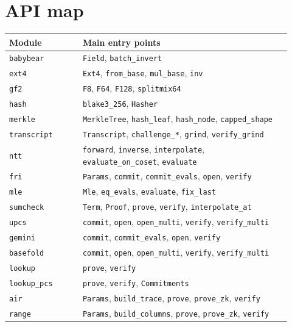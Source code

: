 \documentclass[11pt,a4paper]{article}
\begin{document}
\section{API map}

\begin{longtable}{@{}L{0.24\linewidth}L{0.68\linewidth}@{}}
\toprule
Module & Main entry points \\
\midrule
\endhead
\texttt{babybear} & \texttt{Field}, \texttt{batch\_invert} \\
\texttt{ext4} & \texttt{Ext4}, \texttt{from\_base}, \texttt{mul\_base}, \texttt{inv} \\
\texttt{gf2} & \texttt{F8}, \texttt{F64}, \texttt{F128}, \texttt{splitmix64} \\
\texttt{hash} & \texttt{blake3\_256}, \texttt{Hasher} \\
\texttt{merkle} & \texttt{MerkleTree}, \texttt{hash\_leaf}, \texttt{hash\_node}, \texttt{capped\_shape} \\
\texttt{transcript} & \texttt{Transcript}, \texttt{challenge\_*}, \texttt{grind}, \texttt{verify\_grind} \\
\texttt{ntt} & \texttt{forward}, \texttt{inverse}, \texttt{interpolate}, \texttt{evaluate\_on\_coset}, \texttt{evaluate} \\
\texttt{fri} & \texttt{Params}, \texttt{commit}, \texttt{commit\_evals}, \texttt{open}, \texttt{verify} \\
\texttt{mle} & \texttt{Mle}, \texttt{eq\_evals}, \texttt{evaluate}, \texttt{fix\_last} \\
\texttt{sumcheck} & \texttt{Term}, \texttt{Proof}, \texttt{prove}, \texttt{verify}, \texttt{interpolate\_at} \\
\texttt{upcs} & \texttt{commit}, \texttt{open}, \texttt{open\_multi}, \texttt{verify}, \texttt{verify\_multi} \\
\texttt{gemini} & \texttt{commit}, \texttt{commit\_evals}, \texttt{open}, \texttt{verify} \\
\texttt{basefold} & \texttt{commit}, \texttt{open}, \texttt{open\_multi}, \texttt{verify}, \texttt{verify\_multi} \\
\texttt{lookup} & \texttt{prove}, \texttt{verify} \\
\texttt{lookup\_pcs} & \texttt{prove}, \texttt{verify}, \texttt{Commitments} \\
\texttt{air} & \texttt{Params}, \texttt{build\_trace}, \texttt{prove}, \texttt{prove\_zk}, \texttt{verify} \\
\texttt{range} & \texttt{Params}, \texttt{build\_columns}, \texttt{prove}, \texttt{prove\_zk}, \texttt{verify} \\

\end{longtable}
\end{document}
